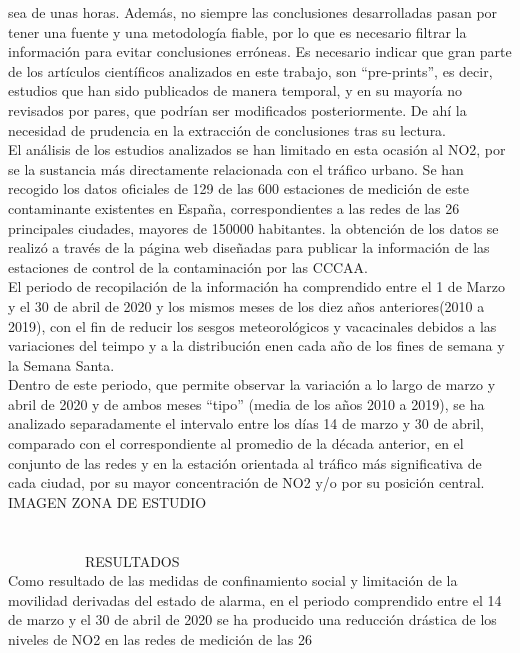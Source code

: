 \documentclass[a4paper,11pt]{article}
\begin{document}
sea de unas horas. Además, no siempre las conclusiones desarrolladas pasan por tener una fuente y una
metodología fiable, por lo que es necesario filtrar la información para evitar conclusiones erróneas. Es
necesario indicar que gran parte de los artículos científicos analizados en este trabajo, son “pre-prints”,
es decir, estudios que han sido publicados de manera temporal, y en su mayoría no revisados por pares,
que podrían ser modificados posteriormente. De ahí la necesidad de prudencia en la extracción de conclusiones
tras su lectura.
 \\ El análisis de los estudios analizados se han limitado en esta ocasión al NO2, por se la sustancia más directamente relacionada con el tráfico urbano. Se han recogido los datos oficiales de 129 de las 600 estaciones de medición de este contaminante existentes en España, correspondientes a las redes de las 26 principales ciudades, mayores de 150000 habitantes. la obtención de los datos se realizó a través de la página web diseñadas para publicar la información de las estaciones de control de la contaminación por las CCCAA.
\\El periodo de recopilación de la información ha comprendido entre el 1 de Marzo y el 30 de abril de 2020 y los mismos meses de los diez años anteriores(2010 a 2019), con el fin de reducir los sesgos meteorológicos y vacacinales debidos a las variaciones del teimpo y a la distribución enen cada año de los fines de semana y la Semana Santa.
\\Dentro de este periodo, que permite observar la variación a lo largo de marzo y abril de 2020 y
de ambos meses “tipo” (media de los años 2010 a 2019), se ha analizado separadamente el intervalo
entre los días 14 de marzo y 30 de abril, comparado con el correspondiente al promedio de la
década anterior, en el conjunto de las redes y en la estación orientada al tráfico más significativa
de cada ciudad, por su mayor concentración de NO2 y/o por su posición central.
IMAGEN ZONA DE ESTUDIO
\ \ \ \ \ \ \ \ \ \ \ \ \ \ \   \ \ \ \ \ \ \\ \ \ \ \ \ \ \ \ \ \ \ \ \ \   \ \ \ \ \ \ \\ \ \ \ \ \ \ \ \ \ \ \ \ \ \   \ \ \ \ \ \ \\ \ \ \ \ \ \ \ \ \ \ \ RESULTADOS
\\  Como resultado de las medidas de confinamiento social y limitación de la movilidad derivadas
del estado de alarma, en el periodo comprendido entre el 14 de marzo y el 30 de abril de 2020
se ha producido una reducción drástica de los niveles de NO2 en las redes de medición de las 26
\end{document}
